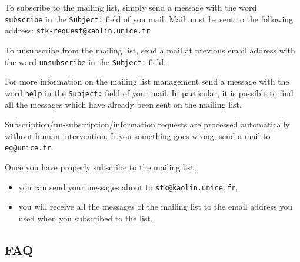 To subscribe to the mailing list, simply send a message with the word {\tt
subscribe} in the {\tt Subject:} field of you mail.  Mail must be sent to the
following address: {\tt stk-request@kaolin.unice.fr}

To unsubscribe from the mailing list, send a mail at previous email address with the word {\tt unsubscribe} in the {\tt Subject:} field.

For more information on the mailing list management send a message with the
word {\tt help} in the {\tt Subject:} field of your mail. In particular, it
is possible to find all the messages which have already been sent on the {\stk} 
mailing list.

Subscription/un-subscription/information requests are processed
automatically without human intervention. If you something goes wrong, send a
mail to {\tt eg@unice.fr}.

Once you have properly subscribe to the mailing list, 
\begin{itemize}
\item you can send your messages about {\stk} to {\tt stk@kaolin.unice.fr},
\item you will receive all the messages of the mailing list to the email 
address you used when you subscribed to the list.
\end{itemize}

\subsection{{\stk} FAQ}

